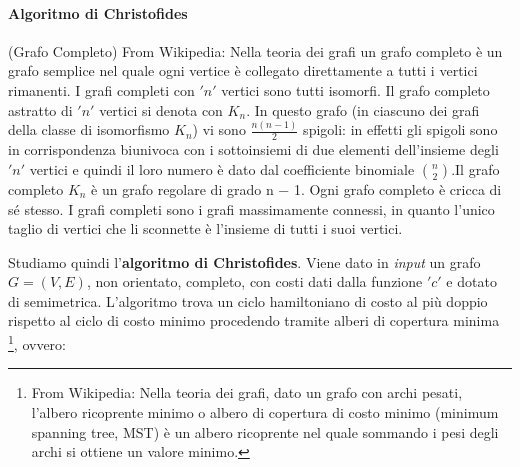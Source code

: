								\paragraph{Algoritmo di Christofides}
												      								\begin{definizione}(Grafo Completo)
												      								        From Wikipedia: Nella teoria dei grafi un grafo completo è un grafo semplice nel quale ogni vertice è collegato direttamente a tutti i vertici rimanenti. I grafi completi con $'n'$ vertici sono tutti isomorfi. Il grafo completo astratto di  $'n'$ vertici si denota con $K_n$. In questo grafo (in ciascuno dei grafi della classe di isomorfismo $K_n$) vi sono $\frac{n(n-1)}{2}$ spigoli: in effetti gli spigoli sono in corrispondenza biunivoca con i sottoinsiemi di due elementi dell'insieme degli $'n'$ vertici e quindi il loro numero è dato dal coefficiente binomiale ${n\choose 2}$.Il grafo completo $K_n$ è un grafo regolare di grado n − 1. Ogni grafo completo è cricca di sé stesso. I grafi completi sono i grafi massimamente connessi, in quanto l'unico taglio di vertici che li sconnette è l'insieme di tutti i suoi vertici. 
												      								\end{definizione}					      	Studiamo quindi l'\textbf{algoritmo di Christofides}. Viene dato in \textit{input} un
												      	grafo $G=(V,E)$, non orientato, completo, con costi dati dalla funzione $ 'c' $ e
												      	dotato di semimetrica. 
												      	L'algoritmo trova un ciclo hamiltoniano di costo al più doppio rispetto al ciclo
												      	di costo minimo procedendo tramite alberi di copertura minima \footnote{From Wikipedia: Nella teoria dei grafi, dato un grafo con archi pesati, l'albero ricoprente minimo o albero di copertura di costo minimo (minimum spanning tree, MST) è un albero ricoprente nel quale sommando i pesi degli archi si ottiene un valore minimo. }, ovvero:
